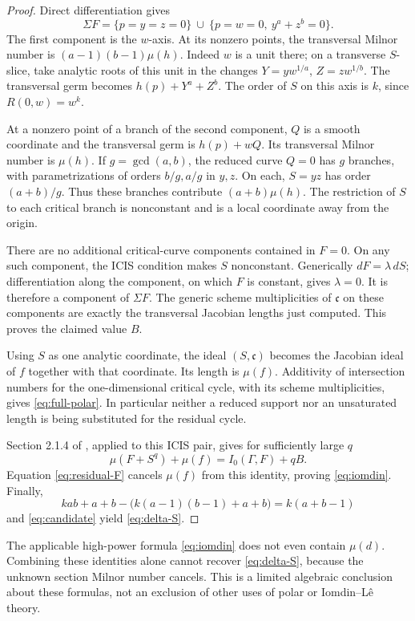 \documentclass[11pt]{article}
\newcommand{\crit}{\mathfrak c}
\begin{document}
\begin{proof}
Direct differentiation gives
\[
 \Sigma F=\{p=y=z=0\}\ \cup\
              \{p=w=0,\ y^a+z^b=0\}.
\]
The first component is the \(w\)-axis.  At its nonzero points,
the transversal Milnor number is
\((a-1)(b-1)\mu(h)\).  Indeed \(w\) is a unit there;
on a transverse \(S\)-slice, take analytic roots of this unit
in the changes \(Y=yw^{1/a}\), \(Z=zw^{1/b}\).
The transversal germ becomes \(h(p)+Y^a+Z^b\).
The order of \(S\) on this axis is \(k\), since
\(R(0,w)=w^k\).

At a nonzero point of a branch of the second component, \(Q\)
is a smooth coordinate and the transversal germ is \(h(p)+wQ\).
Its transversal Milnor number is \(\mu(h)\).
If \(g=\gcd(a,b)\), the reduced curve \(Q=0\) has \(g\)
branches, with parametrizations of orders \(b/g,a/g\)
in \(y,z\).  On each, \(S=yz\) has order \((a+b)/g\).
Thus these branches contribute \((a+b)\mu(h)\).
The restriction of \(S\) to each critical branch is nonconstant
and is a local coordinate away from the origin.

There are no additional critical-curve components contained in
\(F=0\).  On any such component, the ICIS condition makes \(S\)
nonconstant.  Generically \(dF=\lambda\,dS\); differentiation
along the component, on which \(F\) is constant, gives
\(\lambda=0\).  It is therefore a component of \(\Sigma F\).
The generic scheme multiplicities of \(\crit\) on these
components are exactly the transversal Jacobian lengths just
computed.  This proves the claimed value \(B\).

Using \(S\) as one analytic coordinate, the ideal
\((S,\crit)\) becomes the Jacobian ideal of \(f\) together with
that coordinate.  Its length is \(\mu(f)\).  Additivity of
intersection numbers for the one-dimensional critical cycle,
with its scheme multiplicities, gives \eqref{eq:full-polar}.
In particular neither a reduced support nor an unsaturated
length is being substituted for the residual cycle.

Section 2.1.4 of \cite{nemethi79}, applied to this ICIS pair,
gives for sufficiently large \(q\)
\[
 \mu(F+S^q)+\mu(f)=I_0(\Gamma,F)+qB.
\]
Equation \eqref{eq:residual-F} cancels \(\mu(f)\) from this
identity, proving \eqref{eq:iomdin}.  Finally,
\[
 kab+a+b-\bigl(k(a-1)(b-1)+a+b\bigr)=k(a+b-1)
\]
and \eqref{eq:candidate} yield \eqref{eq:delta-S}.
\end{proof}

The applicable high-power formula \eqref{eq:iomdin} does not even
contain \(\mu(d)\).  Combining these identities alone cannot
recover \eqref{eq:delta-S}, because the unknown section Milnor
number cancels.  This is a limited algebraic conclusion about
these formulas, not an exclusion of other uses of polar or
Iomdin--L\^e theory.
\end{document}
